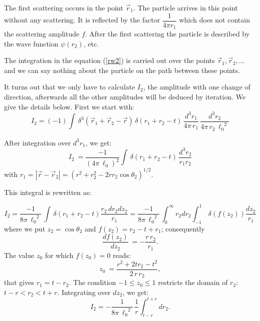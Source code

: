 \documentclass[a4paper,12pt]{article}
\begin{document}
The first scattering occurs in the point $\vec{r}_1$.
The particle arrives in this point
without any scattering. It is reflected by the factor
$\dfrac{1}{4\pi r_1}$ which does not contain the scattering amplitude $f$.
After the first scattering the particle is described by the wave function
$\psi(r_2)$, etc.

 The integration in the equation (\ref{rw2}) is carried out over
the points $\vec{r}_1, \vec{r}_2,\ldots$ and we can say nothing
about the particle on the path between these points.

It turns out that we only have to calculate $I_{2}$, the amplitude
with one change of direction, afterwards all the other amplitudes will be
deduced by iteration. We give the details below. First we start with:
\begin{equation}\label{rw3}
I_{2}=(-1)\int\, \delta^{3}\!\left({\vec{r}_{1} + \vec{r}_{2} -
\vec r}\right)\,\delta(r_{1}+r_{2}-t)\,\frac{d^{3}r_{1}}{4\pi\,r_{1}}\,
\frac{d^{3}r_{2}}{4\pi\,r_{2}\,{\ell_{0}}^{2}}
\end{equation}


After integration over  $d^3r_{1}$, we get:
\[
I_{2}\ =\frac{-1}{(4\pi\,{\ell_{0}})^2}
\int\,\delta\!\left(r_{1}+r_{2}-t\right)\,\frac{d^{3}r_{2}}
{r_{1}r_{2}}
\]
with $r_{1} = \left|\vec{r}-\vec{r}_{2}\right| =  \left(
r^{2}+r_{2}^{2}-2 r r_{2} \cos\theta_{2}\right)^{1/2}$.
\par\noindent

This integral is rewritten as:

$$
I_{2}=\frac{-1}{8\pi\,{\ell_{0}}^{2}}\,\int\,
\delta\left(r_{1}+r_{2} -t\right) \frac{r_{2}\,dr_{2}d z_2}{r_{1}}
= \frac{-1}{8\pi\,{\ell_{0}}^{2}}\,\int_0^{\infty} r_2
dr_2\int_{-1}^1\, \delta\left(f(z_2)\right) \frac{d z_2}{r_{1}}
$$
where we put $z_2 = \cos{\theta_{2}}$ and $f(z_{2}) = r_{2}-t+
r_{1}$; consequently
$$\frac{df(z_2)}{d z_2}\ =-\frac{r\,r_{2}}{r_{1}}.$$
The value  $z_{0}$ for which $f(z_0)=0 $ reads:
$$z_{0}\ =\frac{r^{2}+2t r_{2} -t^{2}}{2\,r\,r_{2}},$$
that gives $r_1=t-r_2$. The condition $-1 \leq z_0 \leq 1$
restricts the domain of $r_2$: $t-r < r_2 <t+r$. Integrating over
$dz_2$, we get:
$$
I_{2}=-\frac{1}{8\pi\,{\ell_{0}}^{2}}\,\frac{1}{r}\int_{t-r}^{t+r}
dr_2.
$$
\end{document}
